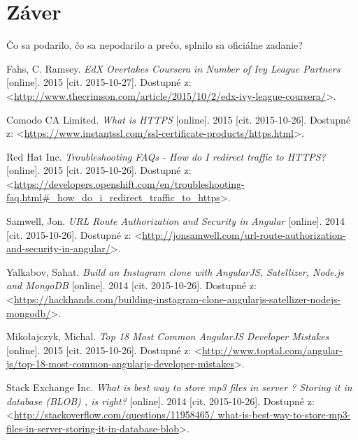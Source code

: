\documentclass[12pt,oneside]{fithesis2}
\begin{document}
    \chapter{Záver}   
       \par Čo sa podarilo, čo sa nepodarilo a prečo, splnilo sa oficiálne zadanie?
       
    \begin{thebibliography}{59}
    
  		Fahs, C. Ramsey.
  		\emph{EdX Overtakes Coursera in Number of Ivy League Partners}
  		[online].
  		2015
  		[cit. 2015-10-27].
  		Dostupné z: <\url{http://www.thecrimson.com/article/2015/10/2/edx-ivy-league-coursera/}>.

  		Comodo CA Limited.
  		\emph{What is HTTPS}
  		[online].
  		2015
  		[cit. 2015-10-26].
  		Dostupné z: <\url{https://www.instantssl.com/ssl-certificate-products/https.html}>.
	
  		Red Hat Inc.
  		\emph{Troubleshooting FAQs - How do I redirect traffic to HTTPS?}
  		[online].
  		2015
  		[cit. 2015-10-26].
  		Dostupné z: <\url{https://developers.openshift.com/en/troubleshooting-faq.html#_how_do_i_redirect_traffic_to_https}>.
  		
  		Samwell, Jon.
  		\emph{URL Route Authorization and Security in Angular}
  		[online].
  		2014
  		[cit. 2015-10-26].
  		Dostupné z: <\url{http://jonsamwell.com/url-route-authorization-and-security-in-angular/}>.
  		
  		Yalkabov, Sahat.
  		\emph{Build an Instagram clone with AngularJS, Satellizer, Node.js and MongoDB}
  		[online].
  		2014
  		[cit. 2015-10-26].
  		Dostupné z: <\url{https://hackhands.com/building-instagram-clone-angularjs-satellizer-nodejs-mongodb/}>.
  		
  		Mikołajczyk, Michal.
  		\emph{Top 18 Most Common AngularJS Developer Mistakes}
  		[online].
  		2015
  		[cit. 2015-10-26].
  		Dostupné z: <\url{http://www.toptal.com/angular-js/top-18-most-common-angularjs-developer-mistakes}>.
  			
  		Stack Exchange Inc.
  		\emph{What is best way to store mp3 files in server ? Storing it in database (BLOB) , is right?}
  		[online].
  		2014
  		[cit. 2015-10-26].
  		Dostupné z: <\url{http://stackoverflow.com/questions/11958465/
  		what-is-best-way-to-store-mp3-files-in-server-storing-it-in-database-blob}>.
  		

\end{thebibliography}
\end{document}
